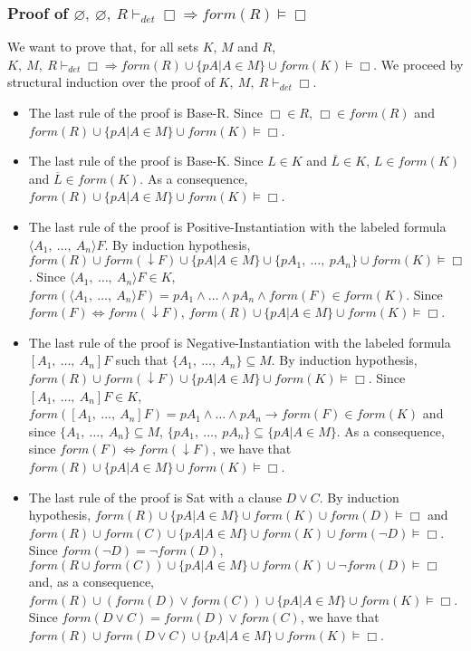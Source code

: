 \documentclass[a4paper,10pt]{article}
\newcommand{\dett}{\vdash_\mathit{det}}
\newcommand{\F}{\mathit{form}}
\begin{document}
\subsubsection*{Proof of $\varnothing,\ \varnothing,\ R\dett\Box\Rightarrow\F(R)\vDash\Box$}
We want to prove that, for all sets $K$, $M$ and $R$, $K,\ M,\ R\dett\Box\Rightarrow
\F(R)\cup\{pA|A\in M\}\cup\F(K)\vDash\Box$. We proceed by structural induction over the proof of
$K,\ M,\ R\dett\Box$.
\begin{itemize}
 \item The last rule of the proof is {\sc Base-R}. Since $\Box\in R$,
$\Box\in\F(R)$ and $\F(R)\cup\{pA|A\in M\}\cup\F(K)\vDash\Box$.
 \item The last rule of the proof is {\sc Base-K}. Since $L\in K$ and $\overline L\in K$,
$L\in \F(K)$ and $\overline L\in\F(K)$. As a consequence, $\F(R)\cup\{pA|A\in M\}\cup\F(K)\vDash\Box$.
 \item The last rule of the proof is {\sc Positive-Instantiation} with the labeled formula
$\langle A_1,\ \dots,\ A_n\rangle F$. By induction hypothesis,
$\F(R)\cup \F(\downarrow F)\cup \{pA|A\in M\}\cup\{pA_1,\ \dots,\ pA_n\}\cup \F(K)\vDash\Box$.
Since $\langle A_1,\ \dots,\ A_n\rangle F\in K$, $\F(\langle A_1,\ \dots,\ A_n\rangle F)=
pA_1\wedge\dots\wedge pA_n\wedge\F(F)\in \F(K)$. Since $\F(F)\Leftrightarrow\F(\downarrow F)$,
$\F(R)\cup\{pA|A\in M\}\cup\F(K)\vDash\Box$.
 \item The last rule of the proof is {\sc Negative-Instantiation} with the labeled formula
$[A_1,\ \dots,\ A_n]F$ such that $\{A_1,\ \dots,\ A_n\}\subseteq M$. By induction hypothesis,
$\F(R)\cup \F(\downarrow F)\cup \{pA|A\in M\}\cup \F(K)\vDash\Box$.
Since $[A_1,\ \dots,\ A_n]F\in K$,
$\F([A_1,\ \dots,\ A_n]F)=pA_1\wedge\dots\wedge pA_n\rightarrow \F(F)\in \F(K)$ and since
$\{A_1,\ \dots,\ A_n\}\subseteq M$, $\{pA_1,\ \dots,\ pA_n\}\subseteq\{pA|A\in M\}$.
As a consequence, since $\F(F)\Leftrightarrow\F(\downarrow F)$,
we have that $\F(R)\cup\{pA|A\in M\}\cup\F(K)\vDash\Box$.
 \item The last rule of the proof is {\sc Sat} with a clause $D\vee C$.
By induction hypothesis,
$\F(R)\cup\{pA|A\in M\}\cup\F(K)\cup\F(D)\vDash\Box$ and
$\F(R)\cup\F(C)\cup\{pA|A\in M\}\cup\F(K)\cup\F(\neg D)\vDash\Box$. Since
$\F(\neg D)=\neg\F(D)$,  $\F(R\cup\F(C))\cup\{pA|A\in M\}\cup\F(K)\cup\neg\F(D)\vDash\Box$ and,
as a consequence, $\F(R)\cup(\F(D)\vee\F(C))\cup\{pA|A\in M\}\cup\F(K)\vDash\Box$.
Since $\F(D\vee C)=\F(D)\vee\F(C)$, we have that
$\F(R)\cup\F(D\vee C)\cup\{pA|A\in M\}\cup\F(K)\vDash\Box$.
\end{itemize}
\end{document}
